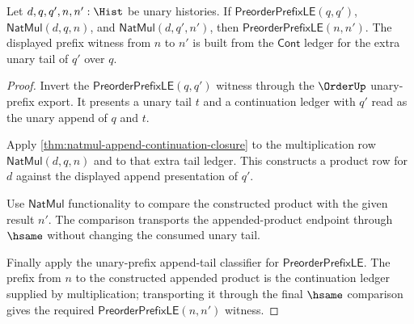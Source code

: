 \begin{theorem}
\label{thm:natmul-unary-prefix-order-monotone}
Let $d,q,q',n,n':\Hist$ be unary histories. If
$\mathsf{PreorderPrefixLE}(q,q')$, $\mathsf{NatMul}(d,q,n)$, and
$\mathsf{NatMul}(d,q',n')$, then $\mathsf{PreorderPrefixLE}(n,n')$. The
displayed prefix witness from $n$ to $n'$ is built from the $\mathsf{Cont}$
ledger for the extra unary tail of $q'$ over $q$.
\end{theorem}
\begin{proof}
Invert the $\mathsf{PreorderPrefixLE}(q,q')$ witness through the
$\OrderUp$ unary-prefix export. It presents a unary tail $t$ and a continuation
ledger with $q'$ read as the unary append of $q$ and $t$.

Apply \autoref{thm:natmul-append-continuation-closure} to the multiplication
row $\mathsf{NatMul}(d,q,n)$ and to that extra tail ledger. This constructs a
product row for $d$ against the displayed append presentation of $q'$.

Use $\mathsf{NatMul}$ functionality to compare the constructed product with
the given result $n'$. The comparison transports the appended-product endpoint
through $\hsame$ without changing the consumed unary tail.

Finally apply the unary-prefix append-tail classifier for
$\mathsf{PreorderPrefixLE}$. The prefix from $n$ to the constructed appended
product is the continuation ledger supplied by multiplication; transporting it
through the final $\hsame$ comparison gives the required
$\mathsf{PreorderPrefixLE}(n,n')$ witness.
\end{proof}


